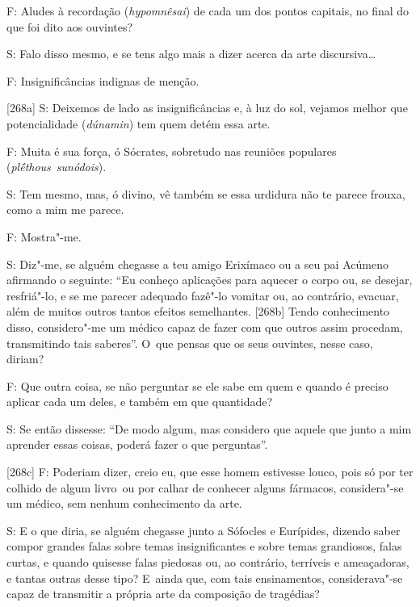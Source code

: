  

F: Aludes à recordação (\emph{hypomnêsai}) de cada um dos pontos
capitais, no final do que foi dito aos ouvintes?

 

S: Falo disso mesmo, e se tens algo mais a dizer acerca da arte
discursiva…

 

F: Insignificâncias indignas de menção.

 

[268a] S: Deixemos de lado as insignificâncias e, à luz do sol,
vejamos melhor que potencialidade (\emph{dúnamin}) tem quem detém essa
arte.

 

F: Muita é sua força, ó Sócrates, sobretudo nas reuniões populares
(\emph{plḗthous}~\emph{sunódois}).

 

S: Tem mesmo, mas, ó divino, vê também se essa urdidura não te parece
frouxa, como a mim me parece.

 

F: Mostra"-me.

 

S: Diz"-me, se alguém chegasse a teu amigo Erixímaco ou a seu pai Acúmeno
afirmando o seguinte: ``Eu conheço aplicações para aquecer o corpo ou,
se desejar, resfriá"-lo, e se me parecer adequado fazê"-lo vomitar ou, ao
contrário, evacuar, além de muitos outros tantos efeitos semelhantes.
[268b] Tendo conhecimento disso, considero"-me um médico capaz de
fazer com que outros assim procedam, transmitindo tais saberes''. O~que
pensas que os seus ouvintes, nesse caso, diriam?

 

F: Que outra coisa, se não perguntar se ele sabe em quem e quando é
preciso aplicar cada um deles, e também em que quantidade?

 

S: Se então dissesse: ``De modo algum, mas considero que aquele que
junto a mim aprender essas coisas, poderá fazer o que perguntas''.

 

[268c] F: Poderiam dizer, creio eu, que esse homem estivesse louco,
pois só por ter colhido de algum livro~ou por calhar de conhecer alguns
fármacos, considera"-se um médico, sem nenhum conhecimento da arte.

 

S: E o que diria, se alguém chegasse junto a Sófocles e Eurípides,
dizendo saber compor grandes falas sobre temas insignificantes e sobre
temas grandiosos, falas curtas, e quando quisesse falas piedosas ou, ao
contrário, terríveis e ameaçadoras, e tantas outras desse tipo? E~ainda
que, com tais ensinamentos, considerava"-se capaz de transmitir a própria
arte da composição de tragédias?

